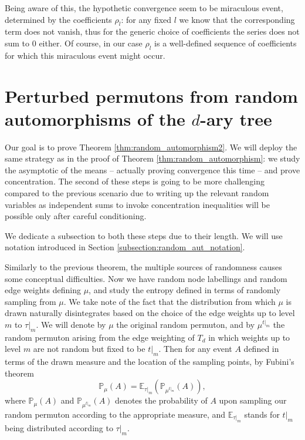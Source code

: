 \documentclass[11pt]{article}
\newcommand{\PP}{\mathbb{P}}
\newcommand{\EE}{\mathbb{E}}
\theoremstyle{definition}
\begin{document}
Being aware of this, the hypothetic convergence seem to be miraculous event, determined by the coefficients $\rho_l$: for any fixed $l$ we know that the corresponding term does not vanish, thus for the generic choice of coefficients the series does not sum to 0 either. Of course, in our case $\rho_l$ is a well-defined sequence of coefficients for which this miraculous event might occur.

\section{Perturbed permutons from random automorphisms of the $d$-ary tree} \label{sec:random2}

 Our goal is to prove Theorem \ref{thm:random_automorphism2}. We will deploy the same strategy as in the proof of Theorem \ref{thm:random_automorphism}: we study the asymptotic of the means -- actually proving convergence this time -- and prove concentration. The second of these steps is going to be more challenging compared to the previous scenario due to writing up the relevant random variables as independent sums to invoke concentration inequalities will be possible only after careful conditioning.
 
 We dedicate a subsection to both these steps due to their length. We will use notation introduced in Section \ref{subsection:random_aut_notation}.

Similarly to the previous theorem, the multiple sources of randomness causes some conceptual difficulties. Now we have random node labellings and random edge weights defining $\mu$, and study the entropy defined in terms of randomly sampling from $\mu$. We take note of the fact that the distribution from which $\mu$ is drawn naturally disintegrates based on the choice of the edge weights up to level $m$ to $\tau|_m$. We will denote by $\mu$ the original random permuton, and by $\mu^{t|_m}$ the random permuton arising from the edge weighting of $T_d$ in which weights up to level $m$ are not random but fixed to be $t|_m$. Then for any event $A$ defined in terms of the drawn measure and the location of the sampling points, by Fubini's theorem
\begin{equation} \label{eq:disintegration}
\PP_{\mu}(A)=\EE_{\tau|_m}(\PP_{\mu^{t|_m}}(A)),
\end{equation}
where $\PP_{\mu}(A)$ and $\PP_{\mu^{t|_m}}(A)$ denotes the probability of $A$ upon sampling our random permuton according to the appropriate measure, and $\EE_{\tau|_m}$ stands for $t|_m$ being distributed according to $\tau|_m$.
\end{document}
